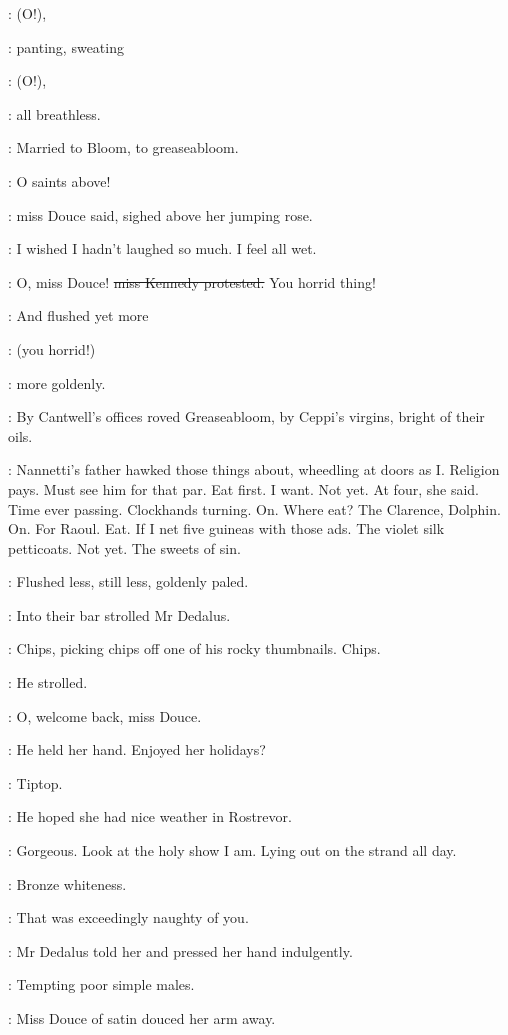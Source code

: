 \MissesDK:
(O!),

:
panting,
sweating

\MissesDK:
(O!),

:
all breathless.

:
Married to Bloom,
to greaseabloom.

\MissD:
O saints above!

:
miss Douce said,
sighed above her jumping rose.

\MissD:
I wished I hadn't laughed so much.
I feel all wet.

\MissK:
O, miss Douce!
\sout{miss Kennedy protested.}
You horrid thing!

:
And flushed yet more

\MissK:
(you horrid!)

:
more goldenly.

:
By Cantwell's offices roved Greaseabloom,
by Ceppi's virgins,
bright of their oils.

\BloomInt:
Nannetti's father hawked those things about,
wheedling at doors as I.
Religion pays.
Must see him for that par.
Eat first.
I want.
Not yet.
At four,
she said.
Time ever passing.
Clockhands turning.
On.
Where eat?
The Clarence,
Dolphin.
On.
For Raoul.
Eat.
If I net five guineas with those ads.
The violet silk petticoats.
Not yet.
The sweets of sin.

:
Flushed less,
still less,
goldenly paled.

:
Into their bar strolled Mr Dedalus.

:
Chips,
picking chips off one of his rocky thumbnails.
Chips.

:
He strolled.

\simon:
O,
welcome back,
miss Douce.

:
He held her hand.
Enjoyed her holidays?

\MissD:
Tiptop.

:
He hoped she had nice weather in Rostrevor.

\MissD:
Gorgeous.
Look at the holy show I am.
Lying out on the strand
all day.

:
Bronze whiteness.

\simon:
That was exceedingly naughty of you.

:
Mr Dedalus told her and pressed her hand indulgently.

\simon:
Tempting poor simple males.

:
Miss Douce of satin douced her arm away.

